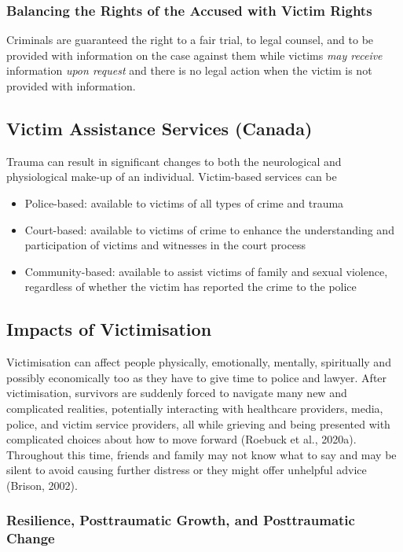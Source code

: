 \documentclass{article}
\begin{document}
\subsubsection*{Balancing the Rights of the Accused with Victim Rights}

Criminals are guaranteed the right to a fair trial, to legal counsel, and to be provided with information on the case against them while victims \textit{may receive} information \textit{upon request} and there is no legal action when the victim is not provided with information.

\subsection{Victim Assistance Services (Canada)}

Trauma can result in significant changes to both the neurological and physiological make-up of an individual. Victim-based services can be

\begin{itemize}
    \item Police-based: available to victims of all types of crime and trauma
    \item Court-based: available to victims of crime to enhance the understanding and participation of victims and witnesses in the court process
    \item Community-based: available to assist victims of family and sexual violence, regardless of whether the victim has reported the crime to the police
\end{itemize}

\subsection{Impacts of Victimisation}

Victimisation can affect people physically, emotionally, mentally, spiritually and possibly economically too as they have to give time to police and lawyer. After victimisation, survivors are suddenly forced to navigate many new and complicated realities, potentially interacting with healthcare providers, media, police, and victim service providers, all while grieving and being presented with complicated choices about how to move forward (Roebuck et al., 2020a). Throughout this time, friends and family may not know what to say and may be silent to avoid causing further distress or they might offer unhelpful advice (Brison, 2002).

\subsubsection*{Resilience, Posttraumatic Growth, and Posttraumatic Change}
\end{document}
